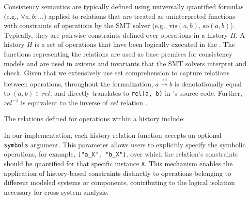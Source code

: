 Consistency semantics are typically defined using universally
quantified formulas
(e.g., $\forall a, b: \dots$) applied to relations that are treated
as uninterpreted
functions with constraints of operations by the SMT solver
(e.g., $\text{vis}(a, b)$, $\text{so}(a, b)$).
Typically, they are pairwise constraints defined over operations in a history $H$.
A history $H$ is a set of operations that have been logically executed in the
\sysmod{}.
The functions representing the relations are used as base premises
for consistency
models and are used in axioms and invariants that the SMT solvers
interpret and check. Given that we extensively use set comprehension to capture relations between operations, throughout the formalization, $a \xrightarrow{\text{rel}} b$ is denotationally equal to $(a, b) \in rel$, and directly translates to \texttt{rel(a, b)} in \sysname's source code.
Further, $rel^{-1}$ is equivalent to the inverse of $rel$ relation \cite{burckhardt2014principles,viotti2016consistency}.

The relations defined for operations within a history include:

In our implementation, each history relation function accepts an optional
\texttt{symbols} argument. This parameter allows users to
explicitly specify the symbolic operations, for example, \texttt{["a\_X",
"b\_X"]}, over which the relation's constraints should be quantified
for that specific instance \texttt{X}. This mechanism enables the application of
history-based constraints distinctly to operations belonging to
different modeled systems or components, contributing to the logical
isolation necessary for cross-system analysis.

